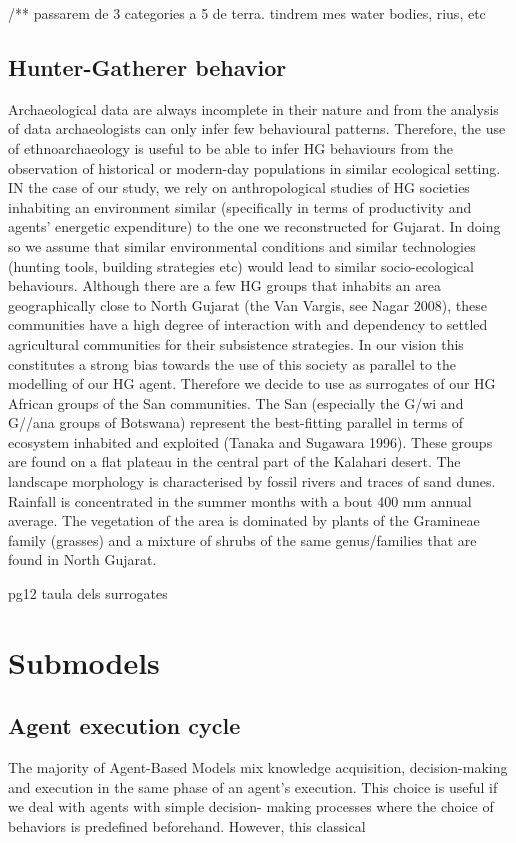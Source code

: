 \begin{enumerate}
\begin{enumerate}
\begin{enumeration}
\begin{enumerate}
\begin{enumerate}
\begin{enumerate}
\begin{enumerate}
/** passarem de 3 categories a 5 de terra. tindrem mes water bodies, rius, etc

\subsection{Hunter-Gatherer behavior}
Archaeological data are always incomplete in their nature and from the analysis of data archaeologists
can only infer few behavioural patterns. Therefore, the use of ethnoarchaeology is useful to be able to
infer HG behaviours from the observation of historical or modern-day populations in similar ecological
setting. IN the case of our study, we rely on anthropological studies of HG societies inhabiting an
environment similar (specifically in terms of productivity and agents’ energetic expenditure) to the one
we reconstructed for Gujarat. In doing so we assume that similar environmental conditions and similar
technologies (hunting tools, building strategies etc) would lead to similar socio-ecological behaviours.
Although there are a few HG groups that inhabits an area geographically close to North Gujarat (the
Van Vargis, see Nagar 2008), these communities have a high degree of interaction with and
dependency to settled agricultural communities for their subsistence strategies. In our vision this
constitutes a strong bias towards the use of this society as parallel to the modelling of our HG agent.
Therefore we decide to use as surrogates of our HG African groups of the San communities.
The San (especially the G/wi and G//ana groups of Botswana) represent the best-fitting parallel in
terms of ecosystem inhabited and exploited (Tanaka and Sugawara 1996). These groups are found on
a flat plateau in the central part of the Kalahari desert. The landscape morphology is characterised by
fossil rivers and traces of sand dunes. Rainfall is concentrated in the summer months with a bout 400
mm annual average. The vegetation of the area is dominated by plants of the Gramineae family
(grasses) and a mixture of shrubs of the same genus/families that are found in North Gujarat.

pg12 taula dels surrogates

\section{Submodels}

\subsection{Agent execution cycle}
The majority of Agent-Based Models mix knowledge acquisition, decision-making and execution in the
same phase of an agent's execution. This choice is useful if we deal with agents with simple decision-
making processes where the choice of behaviors is predefined beforehand. However, this classical


\end{enumerate}
\end{enumerate}
\end{enumerate}
\end{enumerate}
\end{enumeration}
\end{enumerate}
\end{enumerate}

